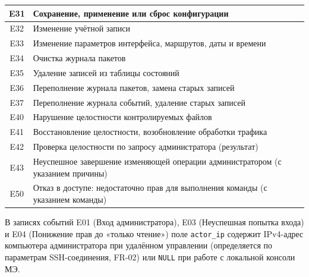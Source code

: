 \documentclass[13pt,a4paper,final]{article}
\begin{document}
\begin{xltabular}{\textwidth}{|c|X|}
		\hline
		E31 & Сохранение, применение или сброс конфигурации \\
		\hline
		E32 & Изменение учётной записи \\
		\hline
		E33 & Изменение параметров интерфейса, маршрутов, даты и времени \\
		\hline
		E34 & Очистка журнала пакетов \\
		\hline
		E35 & Удаление записей из таблицы состояний \\
		\hline
		E36 & Переполнение журнала пакетов, замена старых записей \\
		\hline
		E37 & Переполнение журнала событий, удаление старых записей \\
		\hline
		E40 & Нарушение целостности контролируемых файлов \\
		\hline
		E41 & Восстановление целостности, возобновление обработки трафика \\
		\hline
		E42 & Проверка целостности по запросу администратора (результат) \\
		\hline
		E43 & Неуспешное завершение изменяющей операции администратором (с указанием причины) \\
		\hline
		E50 & Отказ в доступе: недостаточно прав для выполнения команды (с указанием команды) \\
		\hline
	\end{xltabular}

	В записях событий E01 (Вход администратора), E03 (Неуспешная попытка входа) и E04 (Понижение прав до «только чтение») поле \texttt{actor\_ip} содержит IPv4-адрес компьютера администратора при удалённом управлении (определяется по параметрам SSH-соединения, FR-02) или \texttt{NULL} при работе с локальной консоли МЭ.
\end{document}
